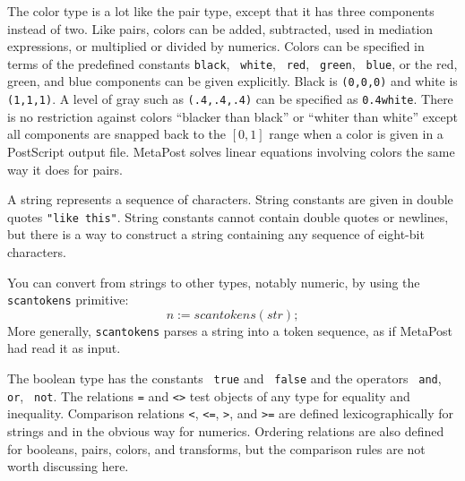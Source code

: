\documentclass{article} %
\def\ttindex#1{{\tt #1}\index{#1?\texttt{#1}}}
\begin{document}
The color type is a lot like the pair type, except
that it has three components instead of two.  Like pairs, colors can be
added, subtracted, used in mediation expressions, or multiplied or
divided by numerics.  Colors can be specified in terms of the predefined
constants {\tt black}\label{Dblack}, {\tt
white}\label{Dwhite}, {\tt
red}\label{Dred}, {\tt
green}\label{Dgreen}, {\tt
blue}\label{Dblue}, or the red, green, and
blue components can be given explicitly.  Black is {\tt (0,0,0)} and
white is {\tt (1,1,1)}.  A level of gray such as {\tt (.4,.4,.4)} can be
specified as {\tt 0.4white}.  There is no restriction against colors
``blacker than black'' or ``whiter than white'' except all components
are snapped back to the $[0,1]$ range when a color is given in a
PostScript output file.  MetaPost solves linear
equations involving colors the same way it does for pairs.

A string represents a sequence of characters.
String constants are given
in double quotes \hbox{\verb|"like this"|}.  String constants cannot contain
double quotes or newlines, but there is a way to construct a string containing
any sequence of eight-bit characters.

\label{Dscantokens}
You can convert from strings to other types, notably numeric, by using
the \ttindex{scantokens} primitive:
$$ n := scantokens (str); $$
More generally, \texttt{scantokens} parses a string into a token
sequence, as if MetaPost had read it as input.

The boolean type has the constants {\tt
true}\label{Dtrue} and {\tt
false}\label{Dfalse} and the operators {\tt
and}\label{Dand}, {\tt
or}\label{Dor}, {\tt
not}\label{Dnot}.  The relations \verb|=| and
\verb|<>|\label{Dcmpar} test objects of any type
for equality and inequality.
Comparison relations \verb|<|,
\verb|<=|, \verb|>|, and
\verb|>=| are defined lexicographically for
strings and in the obvious way for numerics.  Ordering relations are
also defined for booleans, pairs, colors, and transforms, but the
comparison rules are not worth discussing here.
\end{document}
